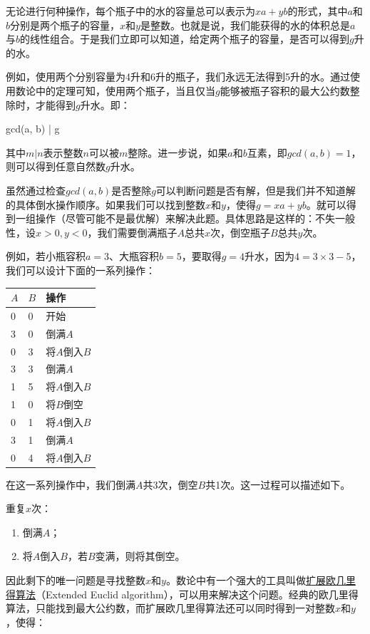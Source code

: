 \documentclass[UTF8]{article}
\begin{document}
无论进行何种操作，每个瓶子中的水的容量总可以表示为$xa + yb$的形式，其中$a$和$b$分别是两个瓶子的容量，$x$和$y$是整数。也就是说，我们能获得的水的体积总是$a$与$b$的线性组合。于是我们立即可以知道，给定两个瓶子的容量，是否可以得到$g$升的水。

例如，使用两个分别容量为4升和6升的瓶子，我们永远无法得到5升的水。通过使用数论中的定理可知，使用两个瓶子，当且仅当$g$能够被瓶子容积的最大公约数整除时，才能得到$g$升水。即：

\be
gcd(a, b) | g
\ee

其中$ m | n $表示整数$n$可以被$m$整除。进一步说，如果$a$和$b$互素，即$gcd(a, b) = 1$，则可以得到任意自然数$g$升水。

虽然通过检查$gcd(a, b)$是否整除$g$可以判断问题是否有解，但是我们并不知道解的具体倒水操作顺序。如果我们可以找到整数$x$和$y$，使得$g = xa + yb$。就可以得到一组操作（尽管可能不是最优解）来解决此题。具体思路是这样的：不失一般性，设$x > 0, y < 0$，我们需要倒满瓶子$A$总共$x$次，倒空瓶子$B$总共$y$次。

例如，若小瓶容积$a=3$、大瓶容积$b=5$，要取得$g=4$升水，因为$4 = 3 \times 3 - 5$，我们可以设计下面的一系列操作：

\begin{tabular}{l|l|l}
$A$ & $B$ & 操作 \\
\hline
0 & 0 & 开始 \\
3 & 0 & 倒满$A$ \\
0 & 3 & 将$A$倒入$B$ \\
3 & 3 & 倒满$A$ \\
1 & 5 & 将$A$倒入$B$ \\
1 & 0 & 将$B$倒空 \\
0 & 1 & 将$A$倒入$B$ \\
3 & 1 & 倒满$A$ \\
0 & 4 & 将$A$倒入$B$ \\
\end{tabular}

在这一系列操作中，我们倒满$A$共3次，倒空$B$共1次。这一过程可以描述如下。

重复$x$次：
\begin{enumerate}
\item 倒满$A$；
\item 将$A$倒入$B$，若$B$变满，则将其倒空。
\end{enumerate}

因此剩下的唯一问题是寻找整数$x$和$y$。数论中有一个强大的工具叫做\underline{扩展欧几里得算法}（Extended Euclid algorithm），可以用来解决这个问题。经典的欧几里得算法，只能找到最大公约数，而扩展欧几里得算法还可以同时得到一对整数$x$和$y$，使得：
\end{document}
